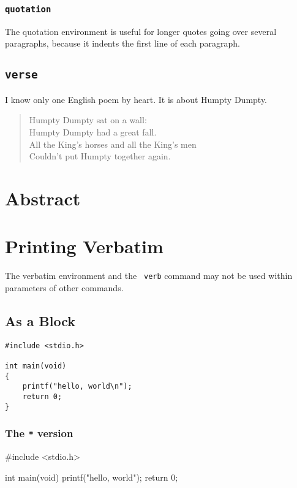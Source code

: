 \documentclass[a4paper]{article}
\begin{document}
\subsubsection*{\texttt{quotation}}
The quotation environment is useful for longer quotes
going over several paragraphs, because it indents the first
line of each paragraph.

\subsection{\texttt{verse}}
I know only one English poem by
heart. It is about Humpty Dumpty.
\begin{flushleft}
\begin{verse}
Humpty Dumpty sat on a wall:\\
Humpty Dumpty had a great fall.\\
All the King's horses and all
the King's men\\
Couldn't put Humpty together
again.
\end{verse}
\end{flushleft}

\newpage
\section{Abstract}
\begin{abstract}
\blindtext
\end{abstract}

\newpage
\section{Printing Verbatim}
The verbatim environment and the \texttt{ verb} command may not be used within parameters of other commands.

\subsection{As a Block}
\begin{verbatim}
#include <stdio.h>

int main(void)
{
    printf("hello, world\n");
    return 0;
}
\end{verbatim}

\subsubsection*{The \texttt{*} version}
\begin{verbatim*}
#include <stdio.h>

int main(void)
{
    printf("hello, world\n");
    return 0;
}
\end{verbatim*}
\end{document}
